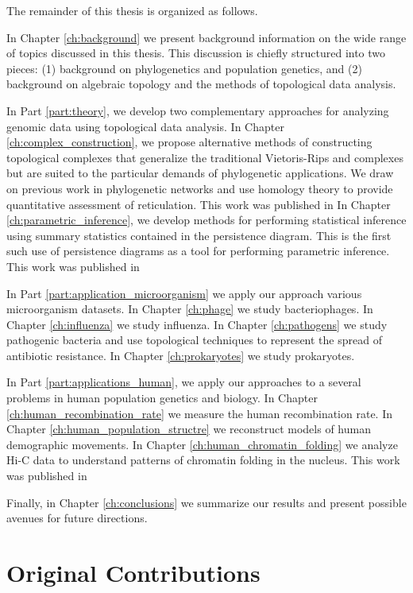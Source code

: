 The remainder of this thesis is organized as follows.

In Chapter \ref{ch:background} we present background information on the wide range of topics discussed in this thesis.
This discussion is chiefly structured into two pieces: (1) background on phylogenetics and population genetics, and (2) background on algebraic topology and the methods of topological data analysis.

In Part \ref{part:theory}, we develop two complementary approaches for analyzing genomic data using topological data analysis.
In Chapter \ref{ch:complex_construction}, we propose alternative methods of constructing topological complexes that generalize the traditional Vietoris-Rips and \Cech complexes but are suited to the particular demands of phylogenetic applications.
We draw on previous work in phylogenetic networks and use homology theory to provide quantitative assessment of reticulation.
This work was published in 
In Chapter \ref{ch:parametric_inference}, we develop methods for performing statistical inference using summary statistics contained in the persistence diagram.
This is the first such use of persistence diagrams as a tool for performing parametric inference. This work was published in \cite{Emmett:2014b}


In Part \ref{part:application_microorganism} we apply our approach various microorganism datasets.
In Chapter \ref{ch:phage} we study bacteriophages.
In Chapter \ref{ch:influenza} we study influenza.
In Chapter \ref{ch:pathogens} we study pathogenic bacteria and use topological techniques to represent the spread of antibiotic resistance.
In Chapter \ref{ch:prokaryotes} we study prokaryotes.

In Part \ref{part:applications_human}, we apply our approaches to a several problems in human population genetics and biology.
In Chapter \ref{ch:human_recombination_rate} we measure the human recombination rate.
In Chapter \ref{ch:human_population_structre} we reconstruct models of human demographic movements.
In Chapter \ref{ch:human_chromatin_folding} we analyze Hi-C data to understand patterns of chromatin folding in the nucleus.
This work was published in 


Finally, in Chapter \ref{ch:conclusions} we summarize our results and present possible avenues for future directions.

\section{Original Contributions}

